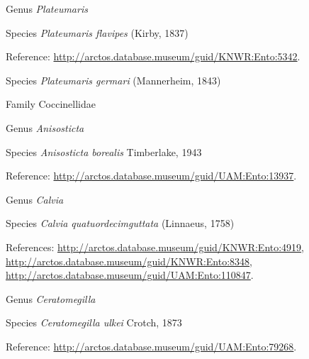 \documentclass[9pt, article]{memoir}
\begin{document}
\begin{multicols}{2}
\vspace{6pt}\noindent\hspace{30pt}Genus \textit{Plateumaris}


\vspace{6pt}\noindent\hspace{36pt}Species \textit{Plateumaris flavipes} (Kirby, 1837)


\vspace{6pt}Reference: 
\url{http://arctos.database.museum/guid/KNWR:Ento:5342}.

\vspace{6pt}\noindent\hspace{36pt}Species \textit{Plateumaris germari} (Mannerheim, 1843)


\vspace{6pt}\noindent\hspace{24pt}Family Coccinellidae


\vspace{6pt}\noindent\hspace{30pt}Genus \textit{Anisosticta}


\vspace{6pt}\noindent\hspace{36pt}Species \textit{Anisosticta borealis} Timberlake, 1943


\vspace{6pt}Reference: 
\url{http://arctos.database.museum/guid/UAM:Ento:13937}.

\vspace{6pt}\noindent\hspace{30pt}Genus \textit{Calvia}


\vspace{6pt}\noindent\hspace{36pt}Species \textit{Calvia quatuordecimguttata} (Linnaeus, 1758)


\vspace{6pt}References: 
\url{http://arctos.database.museum/guid/KNWR:Ento:4919}, 
\url{http://arctos.database.museum/guid/KNWR:Ento:8348}, 
\url{http://arctos.database.museum/guid/UAM:Ento:110847}.

\vspace{6pt}\noindent\hspace{30pt}Genus \textit{Ceratomegilla}


\vspace{6pt}\noindent\hspace{36pt}Species \textit{Ceratomegilla ulkei} Crotch, 1873


\vspace{6pt}Reference: 
\url{http://arctos.database.museum/guid/UAM:Ento:79268}.


\end{multicols}
\end{document}
